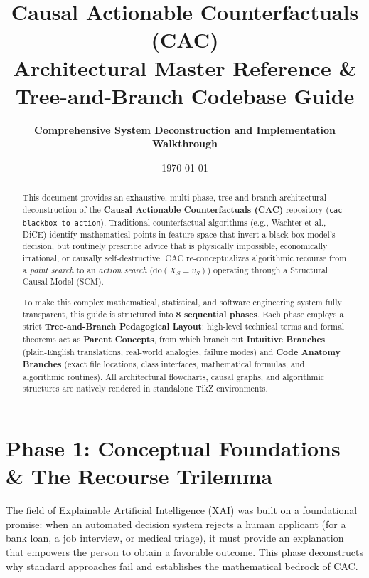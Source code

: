 \documentclass[11pt,a4paper]{article}
\title{\Huge\bfseries Causal Actionable Counterfactuals (CAC)\\[6pt]
\Large\color{parentheader} Architectural Master Reference \& Tree-and-Branch Codebase Guide}
\author{\textbf{Comprehensive System Deconstruction and Implementation Walkthrough}}
\date{\today}
\begin{document}
\maketitle

\begin{abstract}
\noindent
This document provides an exhaustive, multi-phase, tree-and-branch architectural deconstruction of the \textbf{Causal Actionable Counterfactuals (CAC)} repository (\texttt{cac-blackbox-to-action}). Traditional counterfactual algorithms (e.g., Wachter et al., DiCE) identify mathematical points in feature space that invert a black-box model's decision, but routinely prescribe advice that is physically impossible, economically irrational, or causally self-destructive. 
CAC re-conceptualizes algorithmic recourse from a \emph{point search} to an \emph{action search} ($\mathrm{do}(X_S = v_S)$) operating through a Structural Causal Model (SCM). 

\medskip\noindent
To make this complex mathematical, statistical, and software engineering system fully transparent, this guide is structured into \textbf{8 sequential phases}. Each phase employs a strict \textbf{Tree-and-Branch Pedagogical Layout}: high-level technical terms and formal theorems act as \textbf{Parent Concepts}, from which branch out \textbf{Intuitive Branches} (plain-English translations, real-world analogies, failure modes) and \textbf{Code Anatomy Branches} (exact file locations, class interfaces, mathematical formulas, and algorithmic routines). All architectural flowcharts, causal graphs, and algorithmic structures are natively rendered in standalone TikZ environments.
\end{abstract}

\tableofcontents
\newpage

\section{Phase 1: Conceptual Foundations \& The Recourse Trilemma}
\label{sec:phase1}

The field of Explainable Artificial Intelligence (XAI) was built on a foundational promise: when an automated decision system rejects a human applicant (for a bank loan, a job interview, or medical triage), it must provide an explanation that empowers the person to obtain a favorable outcome. This phase deconstructs why standard approaches fail and establishes the mathematical bedrock of CAC.
\end{document}
